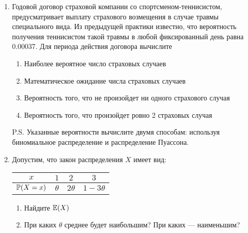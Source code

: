 \begin{enumerate}


\item Годовой договор страховой компании со спортсменом-теннисистом, предусматривает выплату страхового возмещения  в случае травмы специального вида. Из предыдущей практики известно, что вероятность получения теннисистом такой травмы  в любой фиксированный день равна 0.00037. Для периода действия договора вычислите
\begin{enumerate}
\item Наиболее вероятное число страховых случаев
\item Математическое ожидание числа страховых случаев
\item Вероятность того, что не произойдет ни одного страхового случая
\item Вероятность того, что произойдет ровно 2 страховых случая
\end{enumerate}
P.S. Указанные вероятности вычислите двумя способам: используя биномиальное распределение и распределение Пуассона.

\item Допустим, что закон распределения $X$ имеет вид:

\begin{tabular}{@{}cccc@{}}
\toprule
$x$    & $1$      & $2$       & $3$         \\ \midrule
$\P(X=x)$ & $\theta$ & $2\theta$ & $1-3\theta$ \\ \bottomrule
\end{tabular}
\begin{enumerate}
\item Найдите $\E(X)$ %
\item При каких $\theta$ среднее будет наибольшим? При каких — наименьшим?
\end{enumerate}


\end{enumerate}
